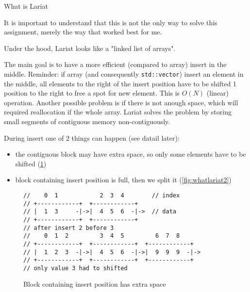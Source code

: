 
\begin{section}{What is Lariat}

 \begin{displayquote}
	 It is important to understand that this is not the only way to solve this
	 assignment, merely the way that worked best for me.
 \end{displayquote}

 \indent Under the hood, Lariat looks like a "linked list of arrays".

 \indent The main goal is to have a more efficient (compared to array) insert in the
 middle.
 Reminder: if array (and consequently \texttt{std::vector}) insert an element
 in the middle, all elements to the right of the insert position have to be
 shifted 1 position to the right to free a spot for new element. This is $O(N)$ (linear) operation. Another possible problem is if there is not anough space,
 which will required reallocation if the whole array.
 Lariat solves the problem by storing small segments of contiguous memory non-contiguously.


 During insert one of $2$ things can happen (see datail later):
 \begin{itemize}
	 \item the contiguous block may have extra space, so only some elements have to be shifted (\ref{fig:whatlariat1})
	 \item block containing insert position is full, then we split it (\ref{fig:whatlariat2})
 \end{itemize}

 \begin{figure}[h]
	 \begin{verbatim}
//    0  1            2  3  4        // index
// +------------+  +------------+
// |  1  3     -|->|  4  5  6  -|->  // data
// +------------+  +------------+
// after insert 2 before 3
//    0  1  2         3  4  5         6  7  8
// +------------+  +------------+  +------------+
// |  1  2  3  -|->|  4  5  6  -|->|  9  9  9  -|->
// +------------+  +------------+  +------------+
// only value 3 had to shifted
	\end{verbatim}
	 \caption{Block containing insert position has extra space}
	 \label{fig:whatlariat1}
 \end{figure}


\end{section}
